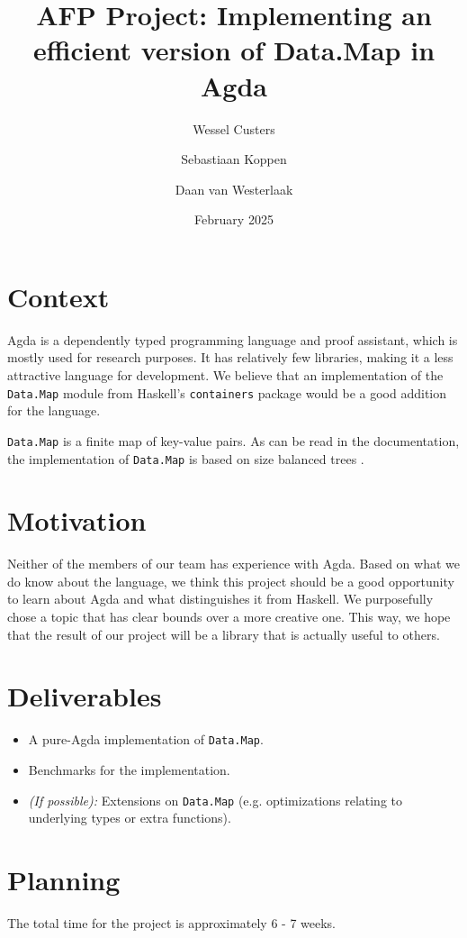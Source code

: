 \documentclass[a4paper,UKenglish,cleveref, autoref, thm-restate]{template/lipics-v2021}
\title{AFP Project: Implementing an efficient version of Data.Map in Agda}
\author{Wessel Custers}{Utrecht University, Netherlands}{}{}{}
\author{Sebastiaan Koppen}{Utrecht University, Netherlands}{}{}{}
\author{Daan van Westerlaak}{Utrecht University, Netherlands}{}{}{}
\date{February 2025}
\begin{document}
\maketitle

\section{Context}
Agda is a dependently typed programming language and proof assistant, which is mostly used for research purposes. It has relatively few libraries, making it a less attractive language for development. We believe that an implementation of the \texttt{Data.Map} module from Haskell's \texttt{containers} package would be a good addition for the language.

\texttt{Data.Map} is a finite map of key-value pairs. As can be read in the documentation, the implementation of \texttt{Data.Map} is based on size balanced trees \cite{adams1993functional, nievergelt1972binary}.

\section{Motivation}
Neither of the members of our team has experience with Agda. Based on what we do know about the language, we think this project should be a good opportunity to learn about Agda and what distinguishes it from Haskell. We purposefully chose a topic that has clear bounds over a more creative one. This way, we hope that the result of our project will be a library that is actually useful to others.

\section{Deliverables}
\begin{itemize}
    \item A pure-Agda implementation of \texttt{Data.Map}.
    \item Benchmarks for the implementation.
    \item \textit{(If possible):} Extensions on \texttt{Data.Map} (e.g. optimizations relating to underlying types or extra functions).
\end{itemize}

\section{Planning}
The total time for the project is approximately 6 - 7 weeks.
\end{document}

